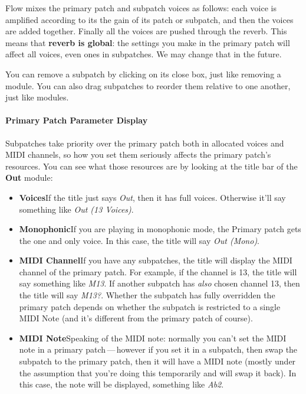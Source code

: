 \documentclass{article}
\begin{document}
Flow mixes the primary patch and subpatch voices as follows: each voice is amplified according to its the gain of its patch or subpatch, and then the voices are added together.  Finally all the voices are pushed through the reverb.  This means that {\bf reverb is global}: the settings you make in the primary patch will affect all voices, even ones in subpatches.  We may change that in the future.

You can remove a subpatch by clicking on its close box, just like removing a module.  You can also drag subpatches to reorder them relative to one another, just like modules.

\paragraph{Primary Patch Parameter Display}  Subpatches take priority over the primary patch both in allocated voices and MIDI channels, so how you set them seriously affects the primary patch's resources.  You can see what those resources are by looking at the title bar of the {\bf Out} module:

\begin{itemize}
\item {\bf Voices}\quad  If the title just says {\it Out}, then it has full voices. Otherwise it'll say something like {\it Out (13 Voices)}.
\item {\bf Monophonic}\quad  If you are playing in monophonic mode, the Primary patch gets the one and only voice.  In this case, the title will say {\it Out (Mono)}.
\item {\bf MIDI Channel}\quad  If you have any subpatches, the title will display the MIDI channel of the primary patch.  For example, if the channel is 13, the title will say something like {\it M13}.  If another subpatch has {\it also} chosen channel 13, then the title will say {\it M13?}.  Whether the subpatch has fully overridden the primary patch depends on whether the subpatch is restricted to a single MIDI Note (and it's different from the primary patch of course).
\item {\bf MIDI Note}\quad  Speaking of the MIDI note: normally you can't set the MIDI note in a primary patch\,---\,however if you set it in a subpatch, then swap the subpatch to the primary patch, then it will have a MIDI note (mostly under the assumption that you're doing this temporarily and will swap it back).  In this case, the note will be displayed, something like {\it Ab2}.
\end{itemize}
\end{document}
